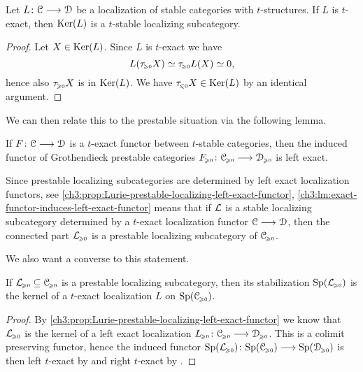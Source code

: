 \begin{lemma}
    \label{ch3:lm:t-exact-then-t-stable-kernel}
    Let $L\:\C\to\D$ be a localization of stable categories with $t$-structures. If $L$ is $t$-exact, then $\Ker(L)$ is a $t$-stable localizing subcategory.  
\end{lemma}
\begin{proof}
    Let $X\in \Ker(L)$. Since $L$ is $t$-exact we have 
    \[L(\tau\geqz X)\simeq \tau\geqz L(X)\simeq 0,\] 
    hence also $\tau\geqz X$ is in $\Ker(L)$. We have $\tau\leqz X\in \Ker(L)$ by an identical argument.  
\end{proof}

We can then relate this to the prestable situation via the following lemma. 

\begin{lemma}
    \label{ch3:lm:exact-functor-induces-left-exact-functor}
    If $F\:\C\to \D$ is a $t$-exact functor between $t$-stable categories, then the induced functor of Grothendieck prestable categories $F\geqz\:\C\geqz\to\D\geqz$ is left exact. 
\end{lemma}

\begin{remark}
    \label{ch3:rm:kernel-of-t-exact-then-prestable-localizing}
    Since prestable localizing subcategories are determined by left exact localization functors, see \cref{ch3:prop:Lurie-prestable-localizing-left-exact-functor}, \cref{ch3:lm:exact-functor-induces-left-exact-functor} means that if $\L$ is a stable localizing subcategory determined by a $t$-exact localization functor $\C\to \D$, then the connected part $\L\geqz$ is a prestable localizing subcategory of $\C\geqz$. 
\end{remark}

We also want a converse to this statement.

\begin{lemma}
    \label{ch3:lm:prestable-localizing-then-kernel-of-t-exact}
    If $\L\geqz\subseteq \C\geqz$ is a prestable localizing subcategory, then its stabilization $\Sp(\L\geqz)$ is the kernel of a $t$-exact localization $L$ on $\Sp(\C\geqz)$.  
\end{lemma}
\begin{proof}
    By \cref{ch3:prop:Lurie-prestable-localizing-left-exact-functor} we know that $\L\geqz$ is the kernel of a left exact localization $L\geqz \: \C\geqz \to \D\geqz$. This is a colimit preserving functor, hence the induced functor $\Sp(\L\geqz)\:\Sp(\C\geqz)\to \Sp(\D\geqz)$ is then left $t$-exact by \cite[C.3.2.1]{lurie_SAG} and right $t$-exact by \cite[C.3.1.1]{lurie_SAG}. 
\end{proof}

